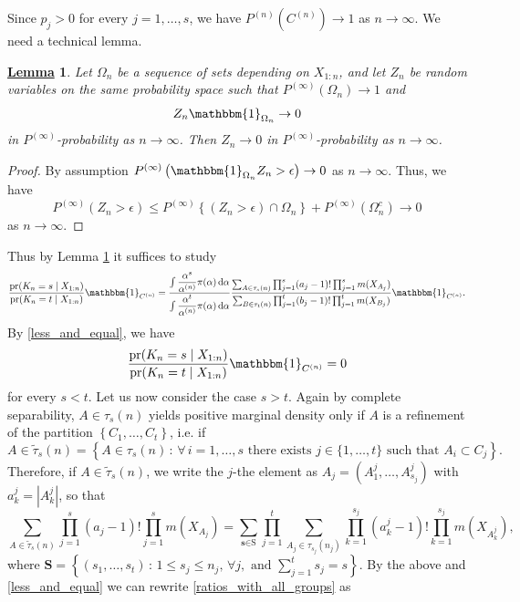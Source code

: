 \documentclass[12pt]{article}
\newtheorem{Lem}{\underline{\bf Lemma}}
\begin{document}
Since $p_j > 0$ for every $j = 1, \dots, s$, we have $P^{(n)}(C^{(n)}) \to 1$ as $n \to \infty$. We need a technical lemma.
\begin{Lem}\label{lemma:ConvProbBound}
Let $\Omega_n$ be a sequence of sets depending on $X_{1:n}$, and let $Z_n$ be random variables on the same probability space such that $P^{(\infty)}(\Omega_n) \to 1$ and
\begin{equation*}
Z_n \mathbbm{1}_{\Omega_n} \to 0
\end{equation*}
in $P^{(\infty)}$-probability as $n \to \infty$. Then $Z_n \to 0$ in $P^{(\infty)}$-probability as $n \to \infty$.
\end{Lem}
\begin{proof}
By assumption $P^{(\infty)}\left(\mathbbm{1}_{\Omega_n} Z_n > \epsilon \right) \to 0$ as $n \to \infty$. Thus, we have
\[
P^{(\infty)}\left(Z_n > \epsilon \right) \leq P^{(\infty)}\left\{(Z_n > \epsilon) \cap \Omega_n \right\}+ P^{(\infty)}\left(\Omega_n^c\right) \to 0
\]
as $n \to \infty$.
\end{proof}
Thus by Lemma \ref{lemma:ConvProbBound} it suffices to study
\begin{equation}\label{ratios_with_all_groups}
\frac{\text{pr}(K_n = s \mid X_{1:n})}{\text{pr}(K_n = t \mid X_{1:n})}\mathbbm{1}_{C^{(n)}}  = \frac{\int \dfrac{\alpha^s}{\alpha^{(n)}} \pi(\alpha) \, \mathrm{d}\alpha}{\int \dfrac{\alpha^t}{\alpha^{(n)}} \pi(\alpha) \, \mathrm{d}\alpha}\frac{\sum_{A \in \tau_s(n)}\prod_{j=1}^s(a_j-1)!\prod_{j=1}^s m(X_{A_j})}{\sum_{B \in \tau_t(n)}\prod_{j=1}^t(b_j-1)!\prod_{j=1}^t m(X_{B_j})}\mathbbm{1}_{C^{(n)}}.
\end{equation}
By \eqref{less_and_equal}, we have
\[
\frac{\text{pr}(K_n = s \mid X_{1:n})}{\text{pr}(K_n = t \mid X_{1:n})}\mathbbm{1}_{C^{(n)}}  = 0
\]
for every $s < t$. Let us now consider the case $s > t$. Again by complete separability, $A \in \tau_s(n)$ yields positive marginal density only if $A$ is a refinement of the partition $\left\{ C_1, \dots, C_t\right\}$, i.e. if
\[
A \in \tilde{\tau}_s(n) = \left\{A \in \tau_s(n) \, : \, \forall \, i = 1, \dots, s \text{ there exists } j \in \{1, \dots, t\} \text{ such that } A_i \subset C_j  \right\}.
\]
Therefore, if $A \in \tilde{\tau}_s(n)$, we write the $j$-the element as $A_j = (A^j_1, \dots, A^j_{s_j})$ with $a^j_k = |A^j_k|$, so that
\[
\sum_{A \in \tilde{\tau}_s(n)}\prod_{j=1}^s(a_j-1)!\prod_{j=1}^s m(X_{A_j}) = \sum_{\textbf{s}\in \text{S}}\prod_{j = 1}^t\sum_{A_j \in \tau_{s_j}(n_j)}\prod_{k=1}^{s_j}(a^j_k-1)!\prod_{k=1}^{s_j} m(X_{A^j_k}),
\]
where $\textbf{S} = \left\{(s_1, \dots, s_t) \, : \, 1 \leq s_j \leq n_j, \, \forall j, \text{ and } \sum_{j = 1}^ts_j = s \right\}$. By the above and \eqref{less_and_equal} we can rewrite \eqref{ratios_with_all_groups} as
\end{document}
